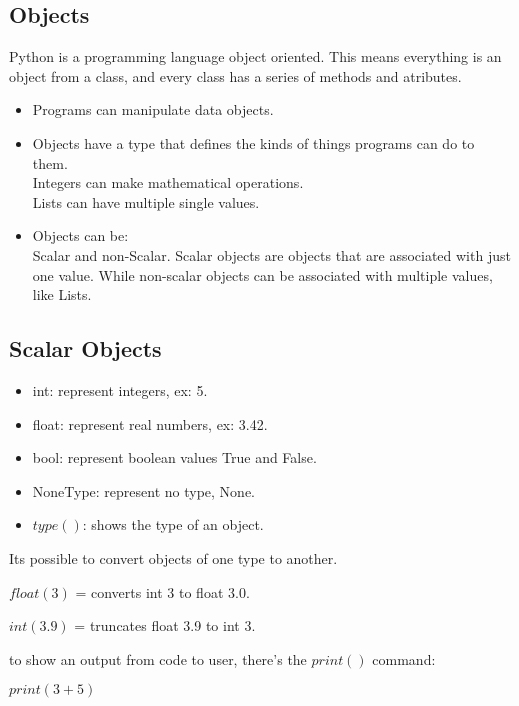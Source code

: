 \documentclass{article}
\begin{document}
{\subsection*{Objects}

Python is a programming language object oriented.
This means everything is an object from a class, 
and every class has a series of methods and atributes.

\begin{itemize}
    \item Programs can manipulate data objects.
    \item Objects have a type that defines the kinds
    of things programs can do to them.\\
    Integers can make mathematical operations.\\
    Lists can have multiple single values.
    \item Objects can be:\\
    Scalar and non-Scalar.
    Scalar objects are objects that are associated with just one value.
    While non-scalar objects can be associated with multiple values, like Lists.
\end{itemize}

\subsection*{Scalar Objects}

\begin{itemize}
    \item int: represent integers, ex: 5.
    \item float: represent real numbers, ex: 3.42.
    \item bool: represent boolean values True and False.
    \item NoneType: represent no type, None.
    \item $type()$: shows the type of an object.
\end{itemize}

Its possible to convert objects of one type
to another.

$float(3)$ = converts int 3 to float 3.0.

$int(3.9)$ = truncates float 3.9 to int 3.

\vspace*{0.30cm}

to show an output from code to user, there's the 
$print()$ command:

$print(3+5)$

}
\end{document}
